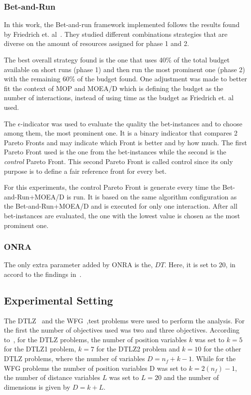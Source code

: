 \subsubsection{Bet-and-Run}

In this work, the Bet-and-run framework implemented follows the results found  by Friedrich et. al~\cite{friedrich2017generic}. They studied different combinations strategies that are diverse on the amount of resources assigned for phase 1 and 2. 

The best overall strategy found is the one that uses 40\% of the total budget available on short runs (phase 1) and then run the most prominent one (phase 2) with the remaining 60\% of the budget found. One adjustment was made to better fit the context of MOP and MOEA/D which is defining the budget as the number of interactions, instead of using time as the budget as Friedrich et. al used.

The $\epsilon$-indicator\cite{zitzler2003performance} was used to evaluate the quality the bet-instances and to choose among them, the most prominent one. It is a binary indicator that compares 2 Pareto Fronts and may indicate which Front is better and by how much. The first Pareto Front used is the one from the bet-instances while the second is the \textit{control} Pareto Front. This second Pareto Front is called control since its only purpose is to define a fair reference front for every bet. 

For this experiments, the control Pareto Front is generate every time the Bet-and-Run+MOEA/D is run. It is based on the same algorithm configuration as the Bet-and-Run+MOEA/D and is executed for only one interaction. After all bet-instances are evaluated, the one with the lowest value is chosen as the most prominent  one.

\subsubsection{ONRA}
The only extra parameter added by ONRA is the, $DT$. Here, it is set to $20$, in accord to the findings in~\cite{zhou2016all}. 


\subsection{Experimental Setting}

The DTLZ~\cite{deb2005scalable} and the WFG~\cite{huband2006review},test problems were used to perform the analysis. For the first the number of objectives used was two and three objectives. According to~\cite{deb2005scalable}, for the DTLZ problems, the number of position variables $k$ was set to $k = 5$ for the DTLZ1 problem, $k = 7$ for the DTLZ2 problem and $k = 10$ for the other DTLZ problems, where the number of variables $D = n_f + k -1$. While for the WFG problems the number of position variables D was set to $k = 2(n_f) - 1$, the number of distance variables $L$ was set to $L = 20$ and the number of dimensions is given by $D = k + L$.


